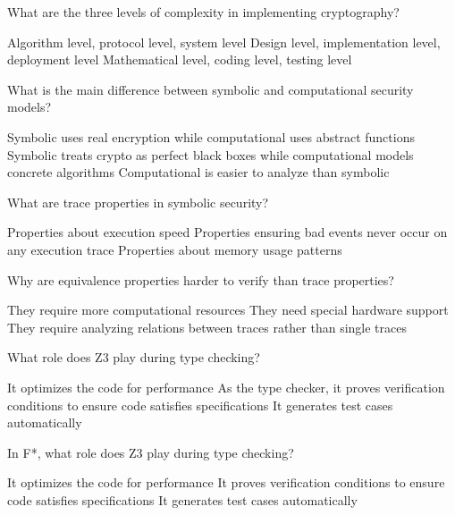 \documentclass[10pt,a4paper,american]{exam}
\begin{document}
\begin{questions}
	\question What are the three levels of complexity in implementing cryptography?
	\begin{randomizechoices}
		\choice Algorithm level, protocol level, system level
		\CorrectChoice Design level, implementation level, deployment level
		\choice Mathematical level, coding level, testing level
	\end{randomizechoices}

	\question What is the main difference between symbolic and computational security models?
	\begin{randomizechoices}
		\choice Symbolic uses real encryption while computational uses abstract functions
		\CorrectChoice Symbolic treats crypto as perfect black boxes while computational models concrete algorithms
		\choice Computational is easier to analyze than symbolic
	\end{randomizechoices}

	\question What are trace properties in symbolic security?
	\begin{randomizechoices}
		\choice Properties about execution speed
		\CorrectChoice Properties ensuring bad events never occur on any execution trace
		\choice Properties about memory usage patterns
	\end{randomizechoices}

	\question Why are equivalence properties harder to verify than trace properties?
	\begin{randomizechoices}
		\choice They require more computational resources
		\choice They need special hardware support
		\CorrectChoice They require analyzing relations between traces rather than single traces
	\end{randomizechoices}

	\question What role does Z3 play during \fstar type checking?
	\begin{randomizechoices}
		\choice It optimizes the code for performance
		\CorrectChoice As the type checker, it proves verification conditions to ensure code satisfies specifications
		\choice It generates test cases automatically
	\end{randomizechoices}

	\question In F*, what role does Z3 play during type checking?
	\begin{randomizechoices}
		\choice It optimizes the code for performance
		\CorrectChoice It proves verification conditions to ensure code satisfies specifications
		\choice It generates test cases automatically
	\end{randomizechoices}


\end{questions}
\end{document}
